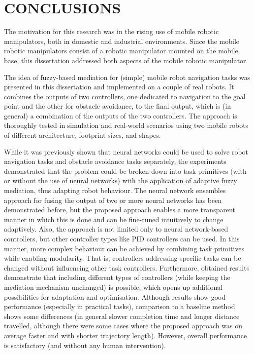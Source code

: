 \chapter{CONCLUSIONS}
\label{chap:Conclusions}

The motivation for this research was in the rising use of mobile robotic manipulators, both in domestic and industrial environments. Since the mobile robotic manipulators consist of a robotic manipulator mounted on the mobile base, this dissertation addressed both aspects of the mobile robotic manipulator. 

The idea of fuzzy-based mediation for (simple) mobile robot navigation tasks was presented in this dissertation and implemented on a couple of real robots. It combines the outputs of two controllers, one dedicated to navigation to the goal point and the other for obstacle avoidance, to the final output, which is (in general) a combination of the outputs of the two controllers. The approach is thoroughly tested in simulation and real-world scenarios using two mobile robots of different architecture, footprint sizes, and shapes.

While it was previously shown that neural networks could be used to solve robot navigation tasks and obstacle avoidance tasks separately, the experiments demonstrated that the problem could be broken down into task primitives (with or without the use of neural networks) with the application of adaptive fuzzy mediation, thus adapting robot behaviour. The neural network ensembles approach for fusing the output of two or more neural networks has been demonstrated before, but the proposed approach enables a more transparent manner in which this is done and can be fine-tuned intuitively to change adaptively. Also, the approach is not limited only to neural network-based controllers, but other controller types like PID controllers can be used. In this manner, more complex behaviour can be achieved by combining task primitives while enabling modularity. That is, controllers addressing specific tasks can be changed without influencing other task controllers. Furthermore, obtained results demonstrate that including different types of controllers (while keeping the mediation mechanism unchanged) is possible, which opens up additional possibilities for adaptation and optimisation. Although results show good performance (especially in practical tasks), comparison to a baseline method shows some differences (in general slower completion time and longer distance travelled, although there were some cases where the proposed approach was on average faster and with shorter trajectory length). However, overall performance is satisfactory (and without any human intervention). 

